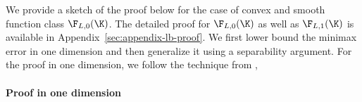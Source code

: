 \label{sec:lb-proof}
We provide a sketch of the proof below for the case of convex and smooth function class $\F_{L,0}(\K)$. The detailed proof for $\F_{L,0}(\K)$ as well as $\F_{L,1}(\K)$ is available in Appendix~\ref{sec:appendix-lb-proof}.
We first lower bound  the minimax error in one dimension and then generalize it using a separability argument. For the proof in one dimension, we follow the technique from \cite{shamir2012complexity,duchi2015optimal},  

\paragraph{Proof in one dimension}


